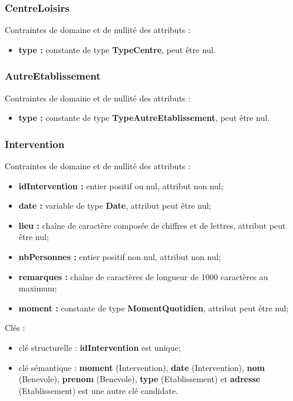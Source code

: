 \subsubsection*{CentreLoisirs}
Contraintes de domaine et de nullité des attributs :
\begin{itemize}
	\item \textbf{type :} constante de type \textbf{TypeCentre}, peut être nul.\\
\end{itemize}

\subsubsection*{AutreEtablissement}
Contraintes de domaine et de nullité des attributs :
\begin{itemize}
	\item \textbf{type :} constante de type \textbf{TypeAutreEtablissement}, peut être nul.\\
\end{itemize}

\subsubsection*{Intervention} 
Contraintes de domaine et de nullité des attributs :
\begin{itemize}
 	\item \textbf{idIntervention :} entier positif ou nul, attribut non nul;
	\item \textbf{date :} variable de type \textbf{Date}, attribut peut être nul;
	\item \textbf{lieu :} chaîne de caractère composée de chiffres et de lettres, attribut peut être nul;
	\item \textbf{nbPersonnes :} entier positif non nul, attribut non nul;  
	\item \textbf{remarques :} chaîne de caractères de longueur de 1000 caractères au maximum;
	\item \textbf{moment :} constante de type \textbf{MomentQuotidien}, attribut peut être nul;\\
\end{itemize}  

Clés : 
\begin{itemize}
\item clé structurelle : \textbf{idIntervention} est unique;
\item clé sémantique : \textbf{moment} (Intervention), \textbf{date} (Intervention), \textbf{nom} (Benevole), \textbf{prenom} (Benevole), \textbf{type} (Etablissement) et \textbf{adresse} (Etablissement) est une autre clé candidate. \\ 
\end{itemize}


